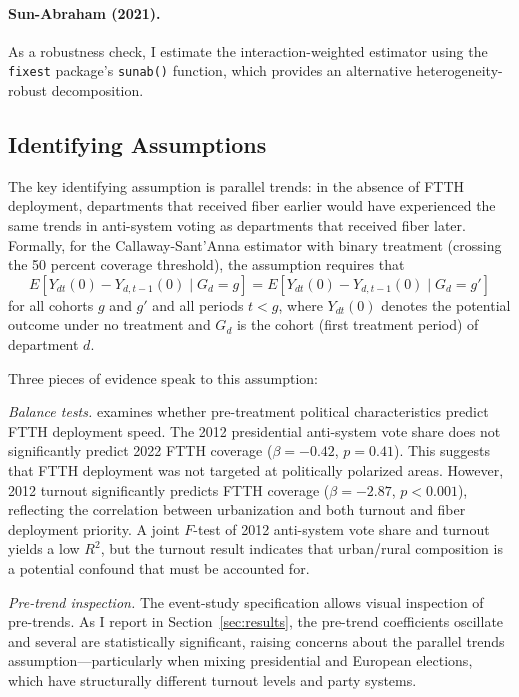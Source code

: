 \documentclass[12pt]{article}
\begin{document}
\paragraph{Sun-Abraham (2021).} As a robustness check, I estimate the \citet{sun2021estimating} interaction-weighted estimator using the \texttt{fixest} package's \texttt{sunab()} function, which provides an alternative heterogeneity-robust decomposition.

\subsection{Identifying Assumptions}

The key identifying assumption is parallel trends: in the absence of FTTH deployment, departments that received fiber earlier would have experienced the same trends in anti-system voting as departments that received fiber later. Formally, for the Callaway-Sant'Anna estimator with binary treatment (crossing the 50 percent coverage threshold), the assumption requires that
\begin{equation}
E[Y_{dt}(0) - Y_{d,t-1}(0) \mid G_d = g] = E[Y_{dt}(0) - Y_{d,t-1}(0) \mid G_d = g']
\end{equation}
for all cohorts $g$ and $g'$ and all periods $t < g$, where $Y_{dt}(0)$ denotes the potential outcome under no treatment and $G_d$ is the cohort (first treatment period) of department $d$.

Three pieces of evidence speak to this assumption:

\emph{Balance tests.}  examines whether pre-treatment political characteristics predict FTTH deployment speed. The 2012 presidential anti-system vote share does not significantly predict 2022 FTTH coverage ($\beta = -0.42$, $p = 0.41$). This suggests that FTTH deployment was not targeted at politically polarized areas. However, 2012 turnout significantly predicts FTTH coverage ($\beta = -2.87$, $p < 0.001$), reflecting the correlation between urbanization and both turnout and fiber deployment priority. A joint $F$-test of 2012 anti-system vote share and turnout yields a low $R^2$, but the turnout result indicates that urban/rural composition is a potential confound that must be accounted for.

\emph{Pre-trend inspection.} The event-study specification allows visual inspection of pre-trends. As I report in Section~\ref{sec:results}, the pre-trend coefficients oscillate and several are statistically significant, raising concerns about the parallel trends assumption---particularly when mixing presidential and European elections, which have structurally different turnout levels and party systems.
\end{document}
